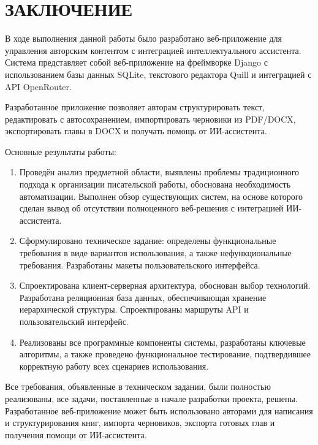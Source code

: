 \section*{ЗАКЛЮЧЕНИЕ}

В ходе выполнения данной работы было разработано веб-приложение для управления авторским контентом с интеграцией интеллектуального ассистента. Система представляет собой веб-приложение на фреймворке Django с использованием базы данных SQLite, текстового редактора Quill и интеграцией с API OpenRouter.

Разработанное приложение позволяет авторам структурировать текст, редактировать с автосохранением, импортировать черновики из PDF/DOCX, экспортировать главы в DOCX и получать помощь от ИИ-ассистента.

Основные результаты работы:

\begin{enumerate}
    \item Проведён анализ предметной области, выявлены проблемы традиционного подхода к организации писательской работы, обоснована необходимость автоматизации. Выполнен обзор существующих систем, на основе которого сделан вывод об отсутствии полноценного веб-решения с интеграцией ИИ-ассистента.
    
    \item Сформулировано техническое задание: определены функциональные требования в виде вариантов использования, а также нефункциональные требования. Разработаны макеты пользовательского интерфейса.
    
    \item Спроектирована клиент-серверная архитектура, обоснован выбор технологий. Разработана реляционная база данных, обеспечивающая хранение иерархической структуры. Спроектированы маршруты API и пользовательский интерфейс.
    
    \item Реализованы все программные компоненты системы, разработаны ключевые алгоритмы, а также проведено функциональное тестирование, подтвердившее корректную работу всех сценариев использования.
\end{enumerate}

Все требования, объявленные в техническом задании, были полностью реализованы, все задачи, поставленные в начале разработки проекта, решены. Разработанное веб-приложение может быть использовано авторами для написания и структурирования книг, импорта черновиков, экспорта готовых глав и получения помощи от ИИ-ассистента.
